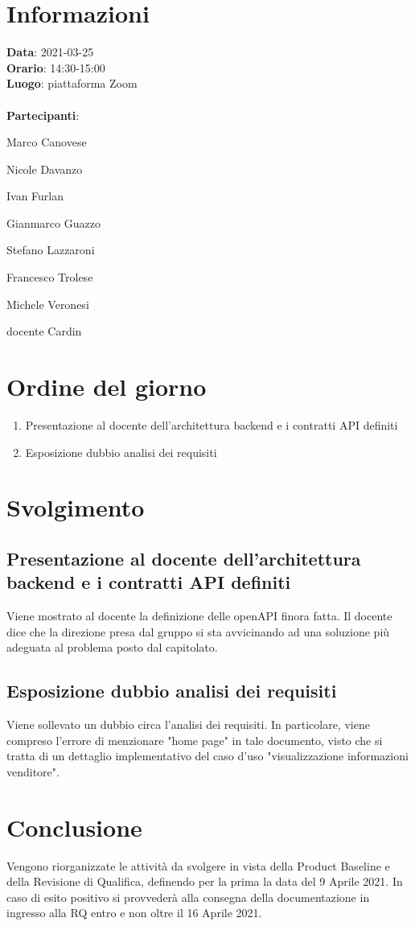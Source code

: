 \section{Informazioni}
\textbf{Data}: 2021-03-25 \\
\textbf{Orario}: 14:30-15:00\\
\textbf{Luogo}: piattaforma Zoom \\\\
\textbf{Partecipanti}:\begin{list}{*}{\setlength{\itemsep}{0cm}}
	\item Marco Canovese
	\item Nicole Davanzo
	\item Ivan Furlan
	\item Gianmarco Guazzo
	\item Stefano Lazzaroni
	\item Francesco Trolese
	\item Michele Veronesi
	\item docente Cardin
\end{list}
\section{Ordine del giorno}
\begin{enumerate}
	\item Presentazione al docente dell'architettura backend e i contratti API definiti
	\item Esposizione dubbio analisi dei requisiti
\end{enumerate}

\section{Svolgimento}
\subsection{Presentazione al docente dell'architettura backend e i contratti API definiti}
Viene mostrato al docente la definizione delle openAPI finora fatta. Il docente dice che la direzione presa dal gruppo si sta
avvicinando ad una soluzione più adeguata al problema posto dal capitolato.

\subsection{Esposizione dubbio analisi dei requisiti}
Viene sollevato un dubbio circa l'analisi dei requisiti. In particolare, viene compreso l'errore di menzionare "home page" in tale documento,
visto che si tratta di un dettaglio implementativo del caso d'uso "visualizzazione informazioni venditore".

\section{Conclusione}
Vengono riorganizzate le attività
da svolgere in vista della Product Baseline e della Revisione di Qualifica, definendo per la prima la data del 9 Aprile 2021.
In caso di esito positivo si provvederà alla consegna della documentazione in ingresso alla RQ entro e non oltre il 16 Aprile 2021.